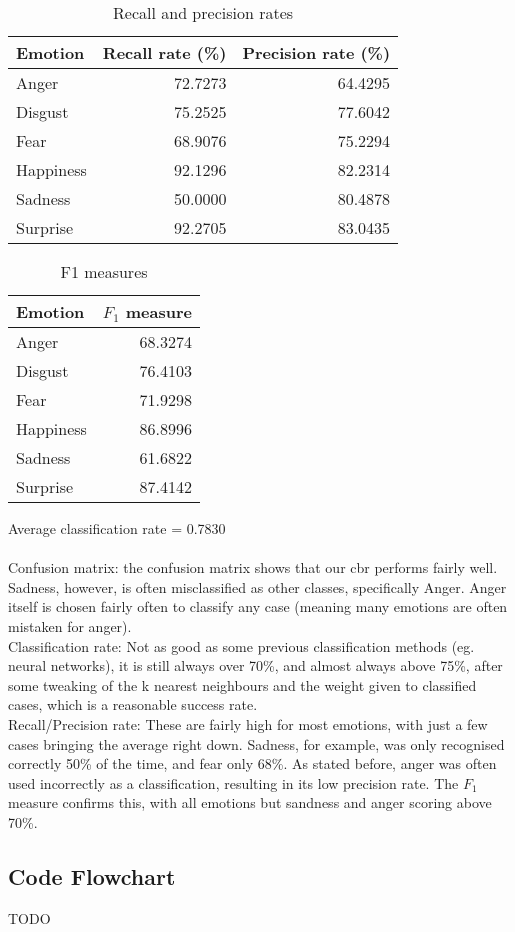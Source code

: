 \documentclass[12pt]{article}
\begin{document}
\begin{table}
\centering
\begin{tabular}{l | r r}
Emotion & Recall rate (\%) & Precision rate (\%) \\
\hline
Anger     & 72.7273 & 64.4295 \\
Disgust   & 75.2525 & 77.6042 \\
Fear      & 68.9076 & 75.2294 \\
Happiness & 92.1296 & 82.2314 \\
Sadness   & 50.0000 & 80.4878 \\
Surprise  & 92.2705 & 83.0435 \\
\end{tabular}
\caption{Recall and precision rates}
\end{table}

\begin{table}
\centering
\begin{tabular}{l | r}
Emotion & \( F_1 \) measure \\
\hline
Anger     & 68.3274 \\
Disgust   & 76.4103 \\
Fear      & 71.9298 \\
Happiness & 86.8996 \\
Sadness   & 61.6822 \\
Surprise  & 87.4142 \\
\end{tabular}
\caption{F1 measures}
\end{table}

Average classification rate = 0.7830 \\ \\

Confusion matrix: the confusion matrix shows that our cbr performs fairly well. Sadness, however, is often misclassified as other classes, specifically Anger. Anger itself is chosen fairly often to classify any case (meaning many emotions are often mistaken for anger). \\
Classification rate: Not as good as some previous classification methods (eg. neural networks), it is still always over 70\%, and almost always above 75\%, after some tweaking of the k nearest neighbours and the weight given to classified cases, which is a reasonable success rate. \\
Recall/Precision rate: These are fairly high for most emotions, with just a few cases bringing the average right down. Sadness, for example, was only recognised correctly 50\% of the time, and fear only 68\%. As stated before, anger was often used incorrectly as a classification, resulting in its low precision rate. The $F_1$ measure confirms this, with all emotions but sandness and anger scoring above 70\%. \\

\newpage
\subsection*{Code Flowchart}

TODO
\end{document}
